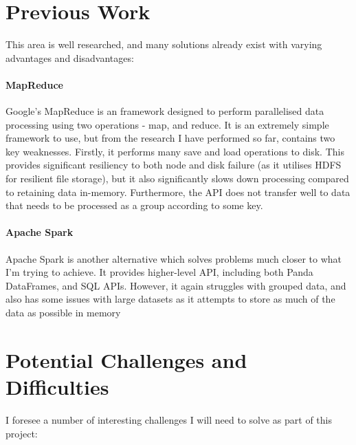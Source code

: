 \documentclass[12pt]{article}
\begin{document}
	
	\section{Previous Work}
	
	This area is well researched, and many solutions already exist with varying advantages and disadvantages:
	
	\paragraph{MapReduce}
	Google’s MapReduce is an framework designed to perform parallelised data processing using two operations - map, and reduce. It is an extremely simple framework to use, but from the research I have performed so far, contains two key weaknesses. Firstly, it performs many save and load operations to disk. This provides significant resiliency to both node and disk failure (as it utilises HDFS for resilient file storage), but it also significantly slows down processing compared to retaining data in-memory. Furthermore, the API does not transfer well to data that needs to be processed as a group according to some key.
	
	\paragraph{Apache Spark}
	Apache Spark is another alternative which solves problems much closer to what I'm trying to achieve. It provides higher-level API, including both Panda DataFrames, and SQL APIs. However, it again struggles with grouped data, and also has some issues with large datasets as it attempts to store as much of the data as possible in memory
	
	\section{Potential Challenges and Difficulties}
	
	I foresee a number of interesting challenges I will need to solve as part of this project:
	
\end{document}
